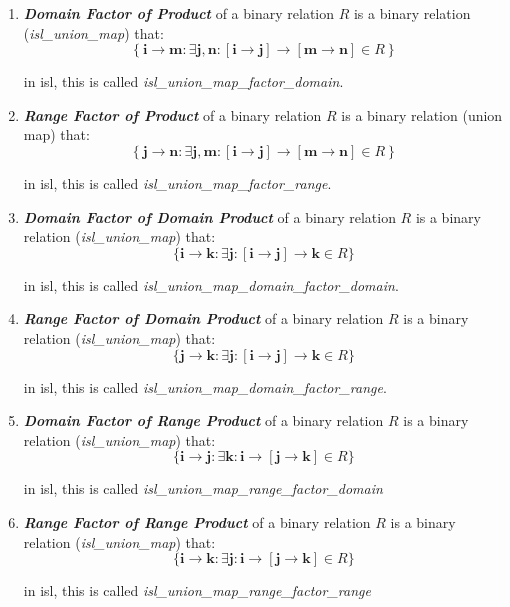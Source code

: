 \begin{enumerate}
  \item \textcolor{vr}{\textbf{\emph{Domain Factor of Product}}} of a binary relation $R$ is a binary relation (\textcolor{pg}{\emph{isl\_union\_map}}) that:
  $$\left\{ \mathbf{i} \rightarrow \mathbf{m} : \exists \mathbf{j},\mathbf{n}:
  [\mathbf{i} \rightarrow \mathbf{j}] \rightarrow [\mathbf{m} \rightarrow \mathbf{n}] \in R \right\}$$

  in isl, this is called \textcolor{pg}{\emph{isl\_union\_map\_factor\_domain}}.

  \item \textcolor{vr}{\textbf{\emph{Range Factor of Product}}} of a binary relation $R$ is a binary relation (union map) that:
  $$\left\{ \mathbf{j} \rightarrow \mathbf{n} : \exists \mathbf{j},\mathbf{m}:
  [\mathbf{i} \rightarrow \mathbf{j}] \rightarrow [\mathbf{m} \rightarrow \mathbf{n}] \in R \right\}$$

  in isl, this is called \textcolor{pg}{\emph{isl\_union\_map\_factor\_range}}.

  \item \textcolor{vr}{\textbf{\emph{Domain Factor of Domain Product}}} of a binary relation $R$ is a binary relation (\textcolor{pg}{\emph{isl\_union\_map}}) that:
  $$\{\mathbf{i} \rightarrow \mathbf{k}: \exists \mathbf{j}: [\mathbf{i} \rightarrow \mathbf{j}] \rightarrow \mathbf{k} \in R \}$$

  in isl, this is called \textcolor{pg}{\emph{isl\_union\_map\_domain\_factor\_domain}}.

  \item \textcolor{vr}{\textbf{\emph{Range Factor of Domain Product}}} of a binary relation $R$ is a binary relation (\textcolor{pg}{\emph{isl\_union\_map}}) that:
  $$\{\mathbf{j} \rightarrow \mathbf{k}: \exists \mathbf{j}: [\mathbf{i} \rightarrow \mathbf{j}] \rightarrow \mathbf{k} \in R \}$$

  in isl, this is called \textcolor{pg}{\emph{isl\_union\_map\_domain\_factor\_range}}.

  \item \textcolor{vr}{\textbf{\emph{Domain Factor of Range Product}}} of a binary relation $R$ is a binary relation (\textcolor{pg}{\emph{isl\_union\_map}}) that:
  $$\{\mathbf{i} \rightarrow \mathbf{j}: \exists \mathbf{k}: \mathbf{i} \rightarrow [\mathbf{j} \rightarrow \mathbf{k}] \in R \}$$

  in isl, this is called \textcolor{pg}{\emph{isl\_union\_map\_range\_factor\_domain}}

  \item \textcolor{vr}{\textbf{\emph{Range Factor of Range Product}}} of a binary relation $R$ is a binary relation (\textcolor{pg}{\emph{isl\_union\_map}}) that:
  $$\{\mathbf{i} \rightarrow \mathbf{k}: \exists \mathbf{j}: \mathbf{i} \rightarrow [\mathbf{j} \rightarrow \mathbf{k}] \in R \}$$

  in isl, this is called \textcolor{pg}{\emph{isl\_union\_map\_range\_factor\_range}}

\end{enumerate}

